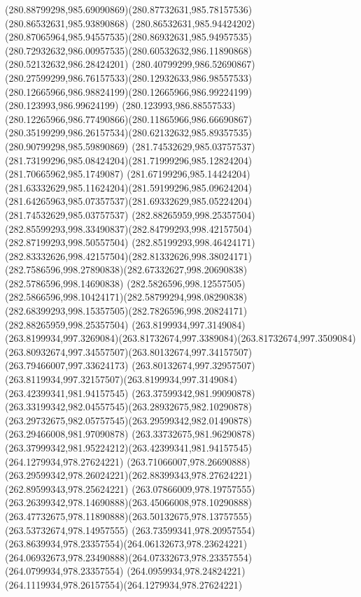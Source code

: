 {{		\curveto(280.88799298,985.69090869)(280.87732631,985.78157536)(280.86532631,985.93890868)
		\curveto(280.86532631,985.94424202)(280.87065964,985.94557535)(280.86932631,985.94957535)
		\curveto(280.72932632,986.00957535)(280.60532632,986.11890868)(280.52132632,986.28424201)
		\curveto(280.40799299,986.52690867)(280.27599299,986.76157533)(280.12932633,986.98557533)
		\curveto(280.12665966,986.98824199)(280.12665966,986.99224199)(280.123993,986.99624199)
		\curveto(280.123993,986.88557533)(280.12265966,986.77490866)(280.11865966,986.66690867)
		\curveto(280.35199299,986.26157534)(280.62132632,985.89357535)(280.90799298,985.59890869)
		\moveto(281.74532629,985.03757537)
		\curveto(281.73199296,985.08424204)(281.71999296,985.12824204)(281.70665962,985.1749087)
		\curveto(281.67199296,985.14424204)(281.63332629,985.11624204)(281.59199296,985.09624204)
		\curveto(281.64265963,985.07357537)(281.69332629,985.05224204)(281.74532629,985.03757537)
		\moveto(282.88265959,998.25357504)
		\curveto(282.85599293,998.33490837)(282.84799293,998.42157504)(282.87199293,998.50557504)
		\curveto(282.85199293,998.46424171)(282.83332626,998.42157504)(282.81332626,998.38024171)
		\curveto(282.7586596,998.27890838)(282.67332627,998.20690838)(282.5786596,998.14690838)
		\curveto(282.5826596,998.12557505)(282.5866596,998.10424171)(282.58799294,998.08290838)
		\curveto(282.68399293,998.15357505)(282.7826596,998.20824171)(282.88265959,998.25357504)
		\moveto(263.8199934,997.3149084)
		\curveto(263.8199934,997.3269084)(263.81732674,997.3389084)(263.81732674,997.3509084)
		\curveto(263.80932674,997.34557507)(263.80132674,997.34157507)(263.79466007,997.33624173)
		\curveto(263.80132674,997.32957507)(263.8119934,997.32157507)(263.8199934,997.3149084)
		\moveto(263.42399341,981.94157545)
		\curveto(263.37599342,981.99090878)(263.33199342,982.04557545)(263.28932675,982.10290878)
		\curveto(263.29732675,982.05757545)(263.29599342,982.01490878)(263.29466008,981.97090878)
		\curveto(263.33732675,981.96290878)(263.37999342,981.95224212)(263.42399341,981.94157545)
		\moveto(264.1279934,978.27624221)
		\curveto(263.71066007,978.26690888)(263.29599342,978.26024221)(262.88399343,978.27624221)
		\lineto(262.89599343,978.25624221)
		\curveto(263.07866009,978.19757555)(263.26399342,978.14690888)(263.45066008,978.10290888)
		\curveto(263.47732675,978.11890888)(263.50132675,978.13757555)(263.53732674,978.14957555)
		\curveto(263.73599341,978.20957554)(263.8639934,978.23357554)(264.06132673,978.23624221)
		\curveto(264.06932673,978.23490888)(264.07332673,978.23357554)(264.0799934,978.23357554)
		\curveto(264.0959934,978.24824221)(264.1119934,978.26157554)(264.1279934,978.27624221)
}}
